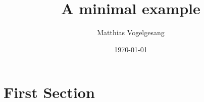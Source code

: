 \documentclass{beamer}
\title{A minimal example}
\date{\today}
\author{Matthias Vogelgesang}
\institute{Centre for Modern Beamer Themes}
\begin{document}
\begin{frame}
\maketitle
\end{frame}
\section{First Section}
\end{document}
